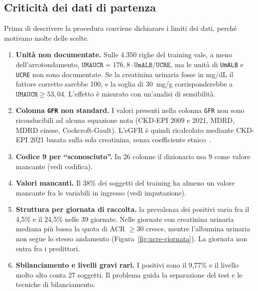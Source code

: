 \documentclass[a4paper, 12pt, oneside]{book}
\begin{document}
\subsection{Criticità dei dati di partenza}

Prima di descrivere la procedura conviene dichiarare i limiti dei dati, perché motivano molte delle scelte.

\begin{enumerate}
	
	\item \textbf{Unità non documentate.} Sulle 4.350 righe del training vale, a meno dell'arrotondamento, $\texttt{UMAUCR} = 176{,}8 \cdot \texttt{UmALB}/\texttt{UCRE}$, ma le unità di \texttt{UmALB} e \texttt{UCRE} non sono documentate. Se la creatinina urinaria fosse in mg/dL il fattore corretto sarebbe 100, e la soglia di 30~mg/g corrisponderebbe a $\texttt{UMAUCR} \geq 53{,}04$. L'effetto è misurato con un'analisi di sensibilità.
	
	\item \textbf{Colonna \texttt{GFR} non standard.} I valori presenti nella colonna \texttt{GFR} non sono riconducibili ad alcuna equazione nota (CKD-EPI 2009 e 2021, MDRD, MDRD cinese, Cockcroft-Gault). L'eGFR è quindi ricalcolato mediante CKD-EPI 2021 basata sulla sola creatinina, senza coefficiente etnico~\cite{inker_new_2021,stevens_kdigo_2024}.
	
	\item \textbf{Codice 9 per \enquote{sconosciuto}.} In 26 colonne il dizionario usa 9 come valore mancante (vedi codifica). 
	
	\item \textbf{Valori mancanti.} Il 38\% dei soggetti del training ha almeno un valore mancante fra le variabili in ingresso (vedi imputazione). 
	
	\item \textbf{Struttura per giornata di raccolta.} la prevalenza dei positivi varia fra il 4,5\% e il 24,5\% nelle 39 giornate. Nelle giornate con creatinina urinaria mediana più bassa la quota di ACR $\geq 30$ cresce, mentre l'albumina urinaria non segue lo stesso andamento (Figura~\ref{fig:ucre-giornata}). La giornata non entra fra i predittori.
	
	\item \textbf{Sbilanciamento e livelli gravi rari.} I positivi sono il 9,77\% e il livello molto alto conta 27 soggetti. Il problema guida la separazione del test e le tecniche di bilanciamento.
\end{enumerate}
	
\end{document}
